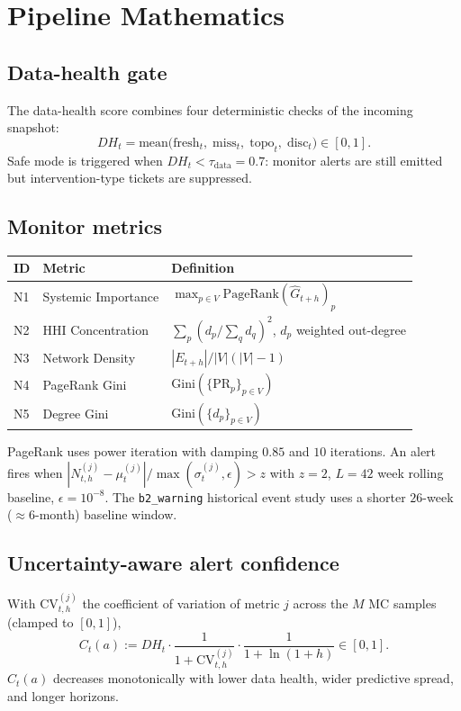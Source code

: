 \section{Pipeline Mathematics}
\label{app:pipeline-math}

\subsection{Data-health gate}
The data-health score combines four deterministic checks of the
incoming snapshot:
\begin{equation}
DH_t = \mathrm{mean}\bigl(\mathrm{fresh}_t,\;\mathrm{miss}_t,\;
                          \mathrm{topo}_t,\;\mathrm{disc}_t\bigr)\in[0,1].
\label{eq:dh}
\end{equation}
Safe mode is triggered when $DH_t\!<\!\tau_{\mathrm{data}}\!=\!0.7$:
monitor alerts are still emitted but intervention-type tickets are
suppressed.

\subsection{Monitor metrics}
\begin{center}\small
\begin{tabular}{@{}lll@{}}
\toprule
ID & Metric                & Definition \\
\midrule
N1 & Systemic Importance  & $\max_{p\in V} \mathrm{PageRank}(\widehat{G}_{t+h})_p$ \\
N2 & HHI Concentration    & $\sum_p (d_p / \sum_q d_q)^2$, $d_p$ weighted out-degree \\
N3 & Network Density      & $|E_{t+h}| / |V|(|V|-1)$ \\
N4 & PageRank Gini        & $\mathrm{Gini}(\{\mathrm{PR}_p\}_{p\in V})$ \\
N5 & Degree Gini          & $\mathrm{Gini}(\{d_p\}_{p\in V})$ \\
\bottomrule
\end{tabular}
\end{center}
PageRank uses power iteration with damping $0.85$ and $10$
iterations. An alert fires when
$|N^{(j)}_{t,h}\!-\!\mu^{(j)}_t|/\max(\sigma^{(j)}_t,\epsilon)\!>\!z$
with $z\!=\!2$, $L\!=\!42$ week rolling baseline,
$\epsilon\!=\!10^{-8}$. The \texttt{b2\_warning} historical event
study uses a shorter $26$-week ($\approx$6-month) baseline window.

\subsection{Uncertainty-aware alert confidence}
With $\mathrm{CV}_{t,h}^{(j)}$ the coefficient of variation of metric
$j$ across the $M$ MC samples (clamped to $[0,1]$),
\begin{equation}
C_t(a) := DH_t \cdot \frac{1}{1+\mathrm{CV}_{t,h}^{(j)}} \cdot
                     \frac{1}{1+\ln(1+h)} \in [0,1].
\label{eq:alert-conf}
\end{equation}
$C_t(a)$ decreases monotonically with lower data health, wider
predictive spread, and longer horizons.

